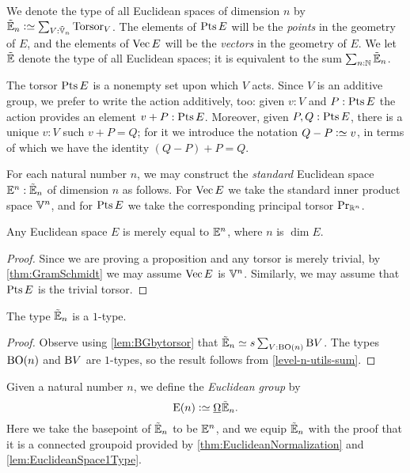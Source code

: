 \begin{definition}
  We denote the type of all Euclidean spaces of dimension $n$ by $\ES_n \defeq
  \sum_{V:\OS_n} \typetorsor_V$.  The elements of $\Points E$ will be the {\em
    points} in the geometry of $E$, and the elements of $\Vectors E$ will be the
      {\em vectors} in the geometry of $E$.
      We let ${\tilde {\mathbb E}}$ denote the type of all Euclidean spaces; it is equivalent to the
      sum $\sum_{n:\mathbb{N}} {\tilde {\mathbb E}}_n$.
\end{definition}

The torsor $\Points E$ is a nonempty set upon which $V$ acts.  Since $V$ is an
additive group, we prefer to write the action additively, too: given $v:V$ and
$P:\Points E$ the action provides an element $v+P:\Points E$.  Moreover, given
$P,Q:\Points E$, there is a unique $v:V$ such $v+P = Q$; for it we introduce
the notation $Q-P \defeq v$, in terms of which we have the identity
$(Q-P)+P=Q$.

For each natural number $n$, we may construct the {\em standard} Euclidean
space $\mathbb E^n : {\tilde {\mathbb E}}_n$ of dimension $n$ as follows.  For $\Vectors E$ we take the
standard inner product space $\mathbb V^n$, and for $\Points E$ we take the
corresponding principal torsor $\mathrm{Pr}_{{\mathbb{R}^n}}$.

\begin{theorem}\label{thm:EuclideanNormalization}
  Any Euclidean space $E$ is merely equal to $\mathbb E^n$, where $n$ is $\dim E$.
\end{theorem}

\begin{proof}
  Since we are proving a proposition and any torsor is merely trivial, by
  \cref{thm:GramSchmidt} we may assume $\Vectors E$ is $\mathbb V^n$.  Similarly, we
  may assume that $\Points E$ is the trivial torsor.
\end{proof}

\begin{lemma}\label{lem:EuclideanSpace1Type}
  The type ${\tilde {\mathbb E}}_n$ is a $1$-type.
\end{lemma}

\begin{proof}
  Observe using \cref{lem:BGbytorsor} that ${\tilde {\mathbb E}}_n \simeq s\sum_{V:\mathrm{B} \mathrm{O}(n)}
  \mathrm{B} V$.  The types $\mathrm{B} \mathrm{O}(n)$ and $\mathrm{B} V$ are $1$-types, so the result
  follows from \cref{level-n-utils-sum}.
\end{proof}

\begin{definition}\label{def:EuclideanGroup}
  Given a natural number $n$, we define the {\em Euclidean group} by
  $$\EucGp n \defeq \mkgroup \ES_n.$$  Here we take the basepoint of ${\tilde {\mathbb E}}_n$ to be $\mathbb E^n$,
  and we equip ${\tilde {\mathbb E}}_n$ with the proof that it is a connected groupoid provided
  by \cref{thm:EuclideanNormalization} and \cref{lem:EuclideanSpace1Type}.
\end{definition}


